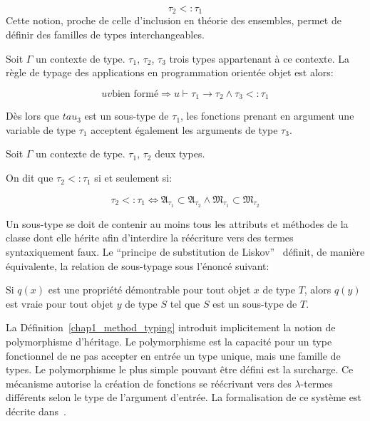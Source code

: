 \begin{equation}
  \tau_2 <: \tau_1
\end{equation}
%
%
Cette notion, proche de celle d'inclusion en théorie des ensembles,
permet de définir des familles de types interchangeables.
%
%
\begin{mydef}\label{chap1_oo_app}
  Soit $\Gamma$ un contexte de type. $\tau_1$, $\tau_2$, $\tau_3$
  trois types appartenant à ce contexte. La règle de typage des
  applications en programmation orientée objet est alors:


  \begin{equation}
    u v \text{bien formé} \Rightarrow u \vdash \tau_1 \rightarrow
    \tau_2 \wedge \tau_3 <: \tau_1
  \end{equation}

  Dès lors que $tau_3$ est un sous-type de $\tau_1$, les fonctions
  prenant en argument une variable de type $\tau_1$ acceptent
  également les arguments de type $\tau_3$.
\end{mydef}
%
\begin{mydef}\label{chap1_method_typing}
  Soit $\Gamma$ un contexte de type. $\tau_1$, $\tau_2$ deux types.

  On dit que $\tau_2 <: \tau_1$ si et seulement si:

  \begin{equation}
    \tau_2 <: \tau_1 \Leftrightarrow \mathfrak{A_{\tau_1}} \subset
    \mathfrak{A_{\tau_2}} \wedge \mathfrak{M_{\tau_1}} \subset
    \mathfrak{M_{\tau_2}}
  \end{equation}
\end{mydef}
%
Un sous-type se doit de contenir au moins tous les attributs et
méthodes de la classe dont elle hérite afin d'interdire la réécriture
vers des termes syntaxiquement faux. Le ``principe de substitution de
Liskov'' \citep{94liskov} définit, de manière équivalente,
la relation de sous-typage sous l'énoncé suivant:
%
\begin{mydef}\label{chap1_liskov}
  Si $q(x)$ est une propriété démontrable pour tout objet $x$ de type
  $T$, alors $q(y)$ est vraie pour tout objet $y$ de type $S$ tel que
  $S$ est un sous-type de $T$.
\end{mydef}


La Définition \ref{chap1_method_typing} introduit implicitement la
notion de polymorphisme d'héritage. Le polymorphisme est la capacité
pour un type fonctionnel de ne pas accepter en entrée un type unique,
mais une famille de types. Le polymorphisme le plus simple pouvant
être défini est la surcharge. Ce mécanisme autorise
la création de fonctions se réécrivant vers des $\lambda$-termes
différents selon le type de l'argument d'entrée. La formalisation de
ce système est décrite dans \citep{95castagna}.

